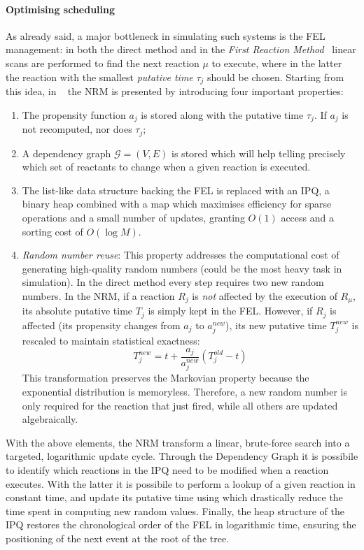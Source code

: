 \paragraph{Optimising scheduling}
As already said, a major bottleneck in simulating such systems is the \ac{FEL}
management: in both the direct method and in the \emph{First Reaction
	Method}~\cite{GILLESPIE1976403} linear scans are performed to find the
next reaction $\mu$ to execute, where in the latter the reaction with
the smallest \emph{putative time} $\tau_j$ should be chosen. Starting from this
idea, in ~\cite{GibsonBruckEESSCSMSMC:2000} the \ac{NRM} is presented by
introducing four important properties:
\begin{enumerate}
	\item The propensity function $a_j$ is stored along with the putative time
	      $\tau_j$. If $a_j$ is not recomputed, nor does $\tau_j$;
	\item A dependency graph $\mathcal{G} = (V, E)$ is stored which will help
	      telling precisely which set of reactants to change when a given
	      reaction is executed.
	\item The list-like data structure backing the \ac{FEL} is replaced with an
	      \ac{IPQ}, a binary heap combined with a map which maximises efficiency
	      for sparse operations and a small number of updates, granting $O(1)$
	      access and a sorting cost of $O(\log M)$.
	\item \emph{Random number reuse}: This property addresses the computational
	      cost of generating high-quality random numbers (could be the most heavy
	      task in simulation). In the direct method every step requires two new
	      random numbers. In the \ac{NRM}, if a reaction $R_j$ is \emph{not}
	      affected by the execution of $R_\mu$, its absolute putative time $T_j$
	      is simply kept in the \ac{FEL}. However, if $R_j$ is affected (its
	      propensity changes from $a_j$ to $a_j^{new}$), its new putative time
	      $T_j^{new}$ is rescaled to maintain statistical exactness:
	      \begin{equation}\label{eq:rand_reuse}
		      T_j^{new} = t + \frac{a_j}{a_j^{new}} (T_j^{old} - t)
	      \end{equation}
	      This transformation preserves the Markovian property because the
	      exponential distribution is memoryless. Therefore, a new random number
	      is only required for the reaction that just fired, while all others are
	      updated algebraically.
\end{enumerate}
With the above elements, the \ac{NRM} transform a linear,
brute-force search into a targeted, logarithmic update cycle. Through the
Dependency Graph it is possibile to identify which reactions in the \ac{IPQ}
need to be modified when a reaction executes. With the latter it is possibile
to perform a lookup of a given reaction in constant time, and update its
putative time using  which drastically reduce the time
spent in computing new random values. Finally, the heap structure of the
\ac{IPQ} restores the chronological order of the \ac{FEL} in logarithmic time,
ensuring the positioning of the next event at the root of the tree.

